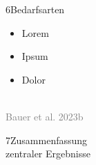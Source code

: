 \documentclass[xcolor=table,9pt,aspectratio=169]{beamer}
\begin{document}
\begin{frame}{\vspace*{10mm}6\hspace*{1em}Bedarfsarten}
\begin{multicols}{2}
   \begin{itemize}
      \item Lorem
      \item Ipsum
      \item Dolor
   \end{itemize}
   \vfill
   \begin{center}
      \\
      \footnotesize{\textcolor{gray}{Bauer et al. 2023b}}
   \end{center}
\end{multicols}
\end{frame}


\begin{frame}
\begin{overlayarea}{\textwidth}{0.81\paperheight}{
   \vspace*{11mm}
   \textcolor{uolblue}
   {7\hspace*{1em}Zusammenfassung\\\hspace*{1.5em}zentraler Ergebnisse}
}
\end{overlayarea}
\end{frame}
\end{document}
